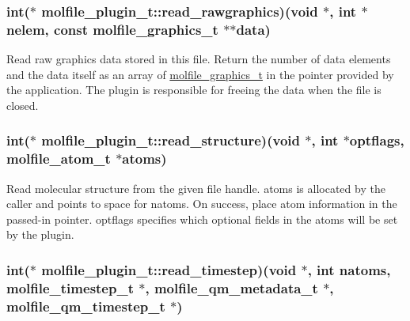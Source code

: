 \hypertarget{structmolfile__plugin__t_a0318edf94ed266fe5a995c02cf2357d9}{
\subsubsection[{read\-\_\-rawgraphics}]{\setlength{\rightskip}{0pt plus 5cm}int($\ast$  {\bf molfile\-\_\-plugin\-\_\-t\-::read\-\_\-rawgraphics})({\bf void} $\ast$, int $\ast$nelem, const {\bf molfile\-\_\-graphics\-\_\-t} $\ast$$\ast$data)}}\label{structmolfile__plugin__t_a0318edf94ed266fe5a995c02cf2357d9}
\-Read raw graphics data stored in this file. \-Return the number of data elements and the data itself as an array of \hyperlink{structmolfile__graphics__t}{molfile\-\_\-graphics\-\_\-t} in the pointer provided by the application. \-The plugin is responsible for freeing the data when the file is closed. \hypertarget{structmolfile__plugin__t_af05a7c088226fc0ecc3fe3feca347754}{
\subsubsection[{read\-\_\-structure}]{\setlength{\rightskip}{0pt plus 5cm}int($\ast$ {\bf molfile\-\_\-plugin\-\_\-t\-::read\-\_\-structure})({\bf void} $\ast$, int $\ast$optflags, {\bf molfile\-\_\-atom\-\_\-t} $\ast$atoms)}}\label{structmolfile__plugin__t_af05a7c088226fc0ecc3fe3feca347754}
\-Read molecular structure from the given file handle. atoms is allocated by the caller and points to space for natoms. \-On success, place atom information in the passed-\/in pointer. optflags specifies which optional fields in the atoms will be set by the plugin. \hypertarget{structmolfile__plugin__t_a72589b78044886d6e2402c73fa2a72e9}{
\subsubsection[{read\-\_\-timestep}]{\setlength{\rightskip}{0pt plus 5cm}int($\ast$  {\bf molfile\-\_\-plugin\-\_\-t\-::read\-\_\-timestep})({\bf void} $\ast$, int natoms, {\bf molfile\-\_\-timestep\-\_\-t} $\ast$, {\bf molfile\-\_\-qm\-\_\-metadata\-\_\-t} $\ast$, {\bf molfile\-\_\-qm\-\_\-timestep\-\_\-t} $\ast$)}}\label{structmolfile__plugin__t_a72589b78044886d6e2402c73fa2a72e9}
